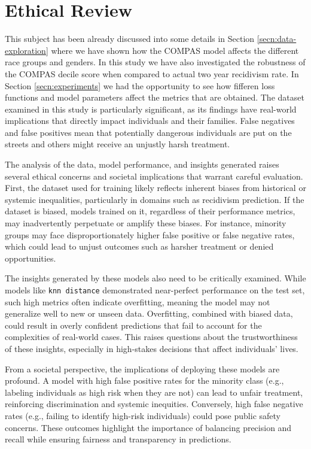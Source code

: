 \section{Ethical Review}

	This subject has been already discussed into some details in Section \ref{secn:data-exploration} where we have shown how the COMPAS model affects the different race groups and genders. In this study we have also investigated the robustness of the COMPAS decile score when compared to actual two year recidivism rate. In Section \ref{secn:experiments} we had the opportunity to see how fifferen loss functions and model parameters affect the metrics that are obtained. The dataset examined in this study is particularly significant, as its findings have real-world implications that directly impact individuals and their families. False negatives and false positives mean that potentially dangerous individuals are put on the streets and others might receive an unjustly harsh treatment.

	The analysis of the data, model performance, and insights generated raises several ethical concerns and societal implications that warrant careful evaluation. First, the dataset used for training likely reflects inherent biases from historical or systemic inequalities, particularly in domains such as recidivism prediction. If the dataset is biased, models trained on it, regardless of their performance metrics, may inadvertently perpetuate or amplify these biases. For instance, minority groups may face disproportionately higher false positive or false negative rates, which could lead to unjust outcomes such as harsher treatment or denied opportunities.
	
	The insights generated by these models also need to be critically examined. While models like \texttt{knn distance} demonstrated near-perfect performance on the test set, such high metrics often indicate overfitting, meaning the model may not generalize well to new or unseen data. Overfitting, combined with biased data, could result in overly confident predictions that fail to account for the complexities of real-world cases. This raises questions about the trustworthiness of these insights, especially in high-stakes decisions that affect individuals' lives.
	
	From a societal perspective, the implications of deploying these models are profound. A model with high false positive rates for the minority class (e.g., labeling individuals as high risk when they are not) can lead to unfair treatment, reinforcing discrimination and systemic inequities. Conversely, high false negative rates (e.g., failing to identify high-risk individuals) could pose public safety concerns. These outcomes highlight the importance of balancing precision and recall while ensuring fairness and transparency in predictions.
	
